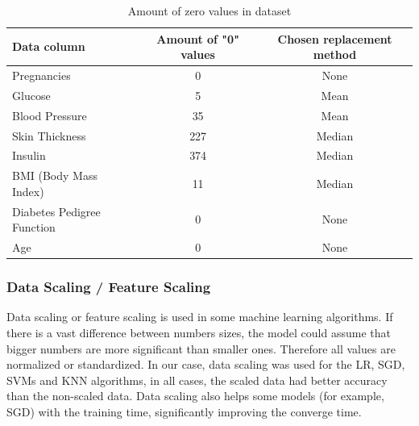 \documentclass[11pt]{article}
\renewcommand{\arraystretch}{1.3}
\begin{document}
	\begin{table}[H]
		\centering
		\begin{tabular}{lcc}
			Data column & Amount of "0" values & Chosen replacement method \\
			\toprule
			Pregnancies          &         0 &  None \\
 			Glucose              &         5 & Mean \\
			Blood Pressure        &        35 & Mean \\
			Skin Thickness        &       227 & Median\\
			Insulin              &       374  & Median\\
			BMI (Body Mass Index) &        11 & Median \\
			Diabetes Pedigree Function  &    0 & None \\
			Age                  &         0 & None \\
		\end{tabular}
		\caption{Amount of zero values in dataset}
		\label{tab:nullValues}
	\end{table}
	\subsubsection{Data Scaling / Feature Scaling}
	Data scaling or feature scaling is used in some machine learning algorithms. If there is a vast difference between numbers sizes, the model could assume that bigger numbers are more significant than smaller ones. Therefore all values are normalized or standardized.
	\medbreak
	In our case, data scaling was used for the LR, SGD, SVMs and KNN algorithms, in all cases, the scaled data had better accuracy than the non-scaled data. Data scaling also helps some models (for example, SGD) with the training time, significantly improving the converge time.
	
\end{document}
